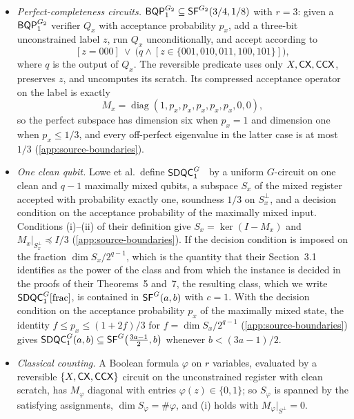 \begin{itemize}
\item \emph{Perfect-completeness circuits.}  \(\mathsf{BQP}_{1}^{G_2}\subseteq\mathsf{SF}^{G_2}(3/4,1/8)\)
with \(r=3\): given a \(\mathsf{BQP}_{1}^{G_2}\) verifier \(Q_x\) with acceptance
probability \(p_x\), add a three-bit unconstrained label \(z\), run \(Q_x\)
unconditionally, and accept according to
\[
[z=000]\ \lor\
\bigl(q\land[z\in\{001,010,011,100,101\}]\bigr),
\]
where \(q\) is the output of \(Q_x\).  The reversible predicate uses only
\(X,\mathsf{CX},\mathsf{CCX}\), preserves \(z\), and uncomputes its scratch.  Its compressed
acceptance operator on the label is exactly
\begin{equation}
\label{eq:eight-label}
M_x=\operatorname{diag}(1,p_x,p_x,p_x,p_x,p_x,0,0),
\end{equation}
so the perfect subspace has dimension six when \(p_x=1\) and dimension one
when \(p_x\le1/3\), and every off-perfect eigenvalue in the latter case is at
most \(1/3\) (\cref{app:source-boundaries}).
\item \emph{One clean qubit.}  Lowe et al.\ define
\(\mathsf{SDQC}_{1}^{G}\)~\cite[Definition~2]{lowe2026normalized} by a uniform
\(G\)-circuit on one clean and \(q-1\) maximally mixed qubits, a subspace
\(S_x\) of the mixed register accepted with probability exactly one, soundness
\(1/3\) on \(S_x^\perp\), and a decision condition on the acceptance
probability of the maximally mixed input.  Conditions (i)--(ii) of their
definition give \(S_x=\ker(I-M_x)\) and \(M_x|_{S_x^\perp}\preceq I/3\)
(\cref{app:source-boundaries}).  If the decision condition is imposed on the
fraction \(\dim S_x/2^{q-1}\), which is the quantity that their Section~3.1
identifies as the power of the class and from which the instance is decided
in the proofs of their Theorems~5 and~7, the resulting class, which we write
\(\mathsf{SDQC}_{1}^{G}[\mathrm{frac}]\), is contained in \(\mathsf{SF}^{G}(a,b)\) with \(c=1\).
With the decision condition on the acceptance probability \(p_x\) of the
maximally mixed state, the identity
\(f\le p_x\le(1+2f)/3\) for \(f=\dim S_x/2^{q-1}\)
(\cref{app:source-boundaries}) gives
\(\mathsf{SDQC}_{1}^{G}(a,b)\subseteq\mathsf{SF}^{G}\bigl(\tfrac{3a-1}{2},b\bigr)\) whenever
\(b<(3a-1)/2\).
\item \emph{Classical counting.}  A Boolean formula \(\varphi\) on \(r\)
variables, evaluated by a reversible \(\{X,\mathsf{CX},\mathsf{CCX}\}\) circuit on the
unconstrained register with clean scratch, has \(M_\varphi\) diagonal with
entries \(\varphi(z)\in\{0,1\}\); so \(S_\varphi\) is spanned by the satisfying
assignments, \(\dim S_\varphi=\#\varphi\), and (i) holds with
\(M_\varphi|_{S^\perp}=0\).
\end{itemize}

